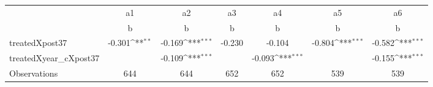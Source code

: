 {
\def\sym#1{\ifmmode^{#1}\else\(^{#1}\)\fi}
\begin{tabular}{l*{6}{c}}
\toprule
                    &          a1         &          a2         &          a3         &          a4         &          a5         &          a6         \\
                    &           b         &           b         &           b         &           b         &           b         &           b         \\
\midrule
treatedXpost37      &      -0.301\sym{**} &      -0.169\sym{***}&      -0.230         &      -0.104         &      -0.804\sym{***}&      -0.582\sym{***}\\
treatedXyear\_cXpost37&                     &      -0.109\sym{***}&                     &      -0.093\sym{***}&                     &      -0.155\sym{***}\\
\midrule
Observations        &         644         &         644         &         652         &         652         &         539         &         539         \\
\bottomrule
\end{tabular}
}
